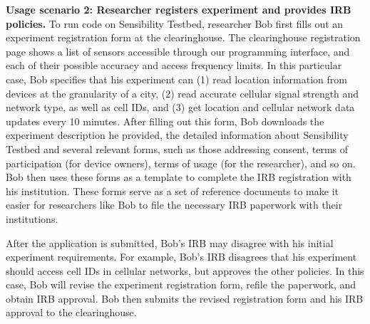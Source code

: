 {{\smallskip

\textbf{Usage scenario 2: Researcher registers experiment and provides IRB policies.}
To run code on Sensibility Testbed, researcher Bob first 
fills out an experiment registration form at the 
clearinghouse. The clearinghouse registration page shows 
a list of sensors accessible through our programming interface, and 
each of their possible accuracy and access frequency limits. 
In this particular case, Bob specifies that 
his experiment can (1) read location information
from devices at the granularity of a city, (2) read accurate
cellular signal strength and network type, as well as
cell IDs, and (3) get location and
cellular network data updates every 10 minutes. 
%
After filling out this form, Bob downloads the experiment description 
he provided, the detailed information about Sensibility Testbed and 
several relevant forms, such as 
those addressing consent, terms of participation (for device owners),  
terms of usage (for the researcher), and so on.   
Bob then uses these forms as a template to complete the IRB registration 
with his institution. These forms serve as a set of reference documents 
to make it easier for researchers like Bob to 
file the necessary IRB paperwork with their institutions.

After the application is submitted, Bob's IRB may disagree with 
his initial experiment requirements. For example, Bob's IRB disagrees 
that his experiment should access cell IDs in cellular networks, but 
approves the other policies. 
In this case, Bob will revise the experiment registration form, refile the paperwork, 
and obtain IRB approval. Bob then submits the revised  
registration form and his IRB approval to the clearinghouse.

}}
